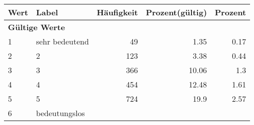      \begin{longtable}{lXrrr}
     \toprule
     \textbf{Wert} & \textbf{Label} & \textbf{Häufigkeit} & \textbf{Prozent(gültig)} & \textbf{Prozent} \\
     \endhead
     \midrule
     \multicolumn{5}{l}{\textbf{Gültige Werte}}\\

     1 &
     \multicolumn{1}{X}{ sehr bedeutend   } &


       \num{49} &
       \num[round-mode=places,round-precision=2]{1.35} &
         \num[round-mode=places,round-precision=2]{0.17} \\

     2 &
     \multicolumn{1}{X}{ 2   } &


       \num{123} &
       \num[round-mode=places,round-precision=2]{3.38} &
         \num[round-mode=places,round-precision=2]{0.44} \\

     3 &
     \multicolumn{1}{X}{ 3   } &


       \num{366} &
       \num[round-mode=places,round-precision=2]{10.06} &
         \num[round-mode=places,round-precision=2]{1.3} \\

     4 &
     \multicolumn{1}{X}{ 4   } &


       \num{454} &
       \num[round-mode=places,round-precision=2]{12.48} &
         \num[round-mode=places,round-precision=2]{1.61} \\

     5 &
     \multicolumn{1}{X}{ 5   } &


       \num{724} &
       \num[round-mode=places,round-precision=2]{19.9} &
         \num[round-mode=places,round-precision=2]{2.57} \\

     6 &
     \multicolumn{1}{X}{ bedeutungslos   } &



\end{longtable}
